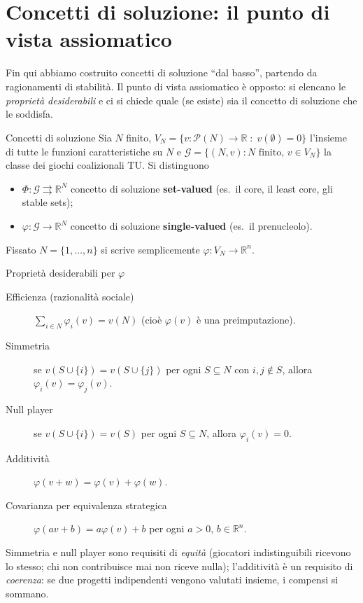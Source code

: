 \documentclass[12pt,a4paper,twoside]{book}
\theoremstyle{plain}
\theoremstyle{definition}
\begin{document}
\section{Concetti di soluzione: il punto di vista assiomatico}

Fin qui abbiamo costruito concetti di soluzione ``dal basso'', partendo da
ragionamenti di stabilità. Il punto di vista assiomatico è opposto: si elencano
le \emph{proprietà desiderabili} e ci si chiede quale (se esiste) sia il concetto
di soluzione che le soddisfa.

\begin{defbox}{Concetti di soluzione}
Sia $N$ finito, $V_N=\{v:\mathcal{P}(N)\to\mathbb{R}\;:\;v(\emptyset)=0\}$ l'insieme
di tutte le funzioni caratteristiche su $N$ e
$\mathcal{G}=\{(N,v): N\text{ finito},\,v\in V_N\}$ la classe dei giochi
coalizionali TU. Si distinguono
\begin{itemize}
  \item $\Phi:\mathcal{G}\rightrightarrows\mathbb{R}^N$ concetto di soluzione
        \textbf{set-valued} (es.\ il core, il least core, gli stable sets);
  \item $\varphi:\mathcal{G}\to\mathbb{R}^N$ concetto di soluzione
        \textbf{single-valued} (es.\ il prenucleolo).
\end{itemize}
Fissato $N=\{1,\dots,n\}$ si scrive semplicemente $\varphi:V_N\to\mathbb{R}^n$.
\end{defbox}

\begin{defbox}{Proprietà desiderabili per $\varphi$}
\begin{description}
  \item[Efficienza (razionalità sociale)] $\displaystyle\sum_{i\in N}\varphi_i(v)=v(N)$
        (cioè $\varphi(v)$ è una preimputazione).
  \item[Simmetria] se $v(S\cup\{i\})=v(S\cup\{j\})$ per ogni $S\subseteq N$ con
        $i,j\notin S$, allora $\varphi_i(v)=\varphi_j(v)$.
  \item[Null player] se $v(S\cup\{i\})=v(S)$ per ogni $S\subseteq N$, allora
        $\varphi_i(v)=0$.
  \item[Additività] $\varphi(v+w)=\varphi(v)+\varphi(w)$.
  \item[Covarianza per equivalenza strategica] $\varphi(av+b)=a\varphi(v)+b$ per
        ogni $a>0$, $b\in\mathbb{R}^n$.
\end{description}
\end{defbox}

Simmetria e null player sono requisiti di \emph{equità} (giocatori
indistinguibili ricevono lo stesso; chi non contribuisce mai non riceve nulla);
l'additività è un requisito di \emph{coerenza}: se due progetti indipendenti
vengono valutati insieme, i compensi si sommano.
\end{document}
